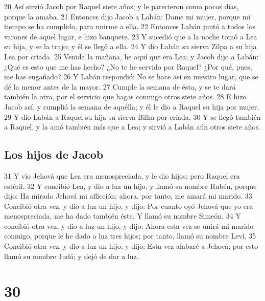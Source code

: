20 Así sirvió Jacob por Raquel siete años; y le parecieron como pocos días, porque la amaba.
21 Entonces dijo Jacob a Labán: Dame mi mujer, porque mi tiempo se ha cumplido, para unirme a ella.
22 Entonces Labán juntó a todos los varones de aquel lugar, e hizo banquete.
23 Y sucedió que a la noche tomó a Lea su hija, y se la trajo; y él se llegó a ella.
24 Y dio Labán su sierva Zilpa a su hija Lea por criada.
25 Venida la mañana, he aquí que era Lea; y Jacob dijo a Labán: ¿Qué es esto que me has hecho? ¿No te he servido por Raquel? ¿Por qué, pues, me has engañado?
26 Y Labán respondió: No se hace así en nuestro lugar, que se dé la menor antes de la mayor.
27 Cumple la semana de ésta, y se te dará también la otra, por el servicio que hagas conmigo otros siete años.
28 E hizo Jacob así, y cumplió la semana de aquélla; y él le dio a Raquel su hija por mujer.
29 Y dio Labán a Raquel su hija su sierva Bilha por criada.
30 Y se llegó también a Raquel, y la amó también más que a Lea; y sirvió a Labán aún otros siete años.

\section{Los hijos de Jacob}

31 Y vio Jehová que Lea era menospreciada, y le dio hijos; pero Raquel era estéril.
32 Y concibió Lea, y dio a luz un hijo, y llamó su nombre Rubén, porque dijo: Ha mirado Jehová mi aflicción; ahora, por tanto, me amará mi marido.
33 Concibió otra vez, y dio a luz un hijo, y dijo: Por cuanto oyó Jehová que yo era menospreciada, me ha dado también éste. Y llamó su nombre Simeón.
34 Y concibió otra vez, y dio a luz un hijo, y dijo: Ahora esta vez se unirá mi marido conmigo, porque le he dado a luz tres hijos; por tanto, llamó su nombre Leví.
35 Concibió otra vez, y dio a luz un hijo, y dijo: Esta vez alabaré a Jehová; por esto llamó su nombre Judá; y dejó de dar a luz.

\chapter{30}

